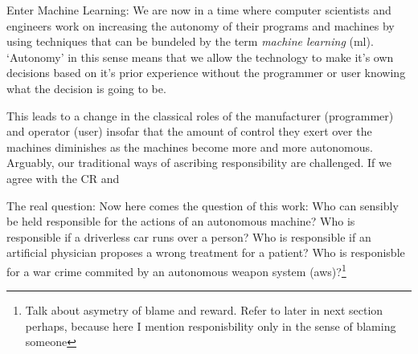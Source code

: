 \documentclass{article}
\begin{document}
Enter Machine Learning:
We are now in a time where computer scientists and engineers work on increasing
the autonomy of their programs and machines by using techniques that can be
bundeled by the term \textit{machine learning} (\acrshort{ml}). `Autonomy' in this sense
means that we allow the technology to make it's own decisions based on it's
prior experience without the programmer or user knowing what the decision is
going to be. 


This leads to a change in the classical roles of the manufacturer
(programmer) and operator (user) insofar that the amount of control they exert
over the machines diminishes as the machines become more and more autonomous.
Arguably, our traditional ways of ascribing responsibility are challenged. If we
agree with the CR and 



The real question:
Now here comes the question of this work: Who can sensibly be held responsible for the
actions of an autonomous machine?
Who is responsible if a driverless car runs over a person? Who is responsible if
an artificial physician proposes a wrong treatment for a patient? Who is
responisble for a war crime commited by an autonomous weapon system
(\acrshort{aws})?\footnote{Talk about asymetry of blame and reward. Refer to
later in next section perhaps, because here I mention responisbility only in the
sense of blaming someone}\\
\end{document}
